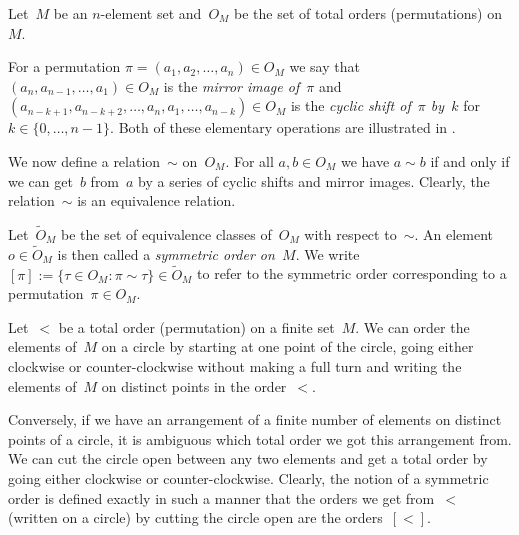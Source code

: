 Let~$M$ be an $n$-element set and~$O_M$ be the set of total orders (permutations) on~$M$.

For a permutation $\pi = (a_1, a_2, \dotsc, a_n) \in O_M$ we say that~$(a_n, a_{n-1}, \dotsc, a_1) \in O_M$ is the \emph{mirror image of~$\pi$} and~$(a_{n-k+1}, a_{n-k+2}, \dotsc, a_n, a_1, \dotsc, a_{n-k}) \in O_M$ is the \emph{cyclic shift of~$\pi$ by~$k$} for~$k \in \{0, \dotsc, n-1\}$. Both of these elementary operations are illustrated in .

We now define a relation~$\sim$ on~$O_M$. For all $a, b \in O_M$ we have
$a\sim b$ if and only if we can get~$b$ from~$a$ by a series of cyclic shifts
and mirror images. Clearly, the relation~$\sim$ is an equivalence relation.

Let~$\widetilde{O}_M$ be the set of equivalence classes of~$O_M$ with respect to~$\sim$. An
element~$o \in \widetilde{O}_M$ is then called a \emph{symmetric order on~$M$}. We write~$[\pi] := \{\tau \in O_M: \pi \sim \tau\} \in\widetilde{O}_M$ to refer to the symmetric order corresponding to a permutation~$\pi \in O_M$.

Let~$<$ be a total order (permutation) on a finite set~$M$. We can order the elements
of~$M$ on a circle by starting at one point of the circle, going either clockwise
or counter-clockwise without making a full turn and writing the elements of~$M$ on distinct points in the order~$<$. 

Conversely, if we have an arrangement of a finite number of elements on distinct points of a circle, it is ambiguous which total order we got this arrangement from. We can cut the circle open between any two elements and get a total
order by going either clockwise or counter-clockwise. Clearly, the notion of a symmetric order is defined
exactly in such a manner that the orders we get from~$<$ (written on a circle) by cutting the circle open are the orders~$[<]$.

